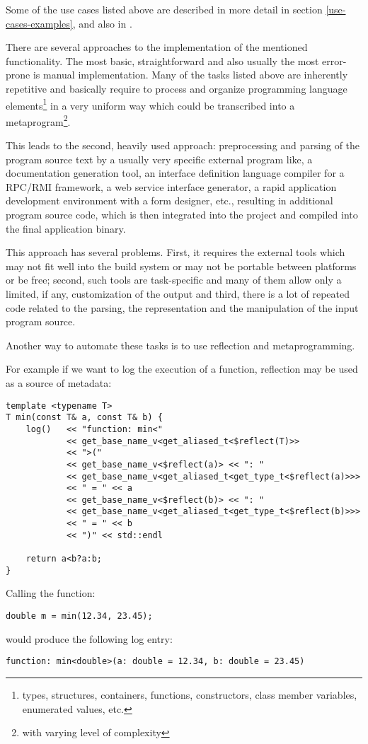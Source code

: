 Some of the use cases listed above are described in more detail in section
\ref{use-cases-examples}, and also in \cite{Chochlik-P0385R1,Chochlik-N4452}.

There are several approaches to the implementation of the mentioned functionality.
The most basic, straightforward and also usually the most
error-prone is manual implementation. Many of the tasks listed above
are inherently repetitive and basically require to process and organize
programming language elements\footnote{types, structures, containers, functions,
constructors, class member variables, enumerated values, etc.}
in a very uniform way which could be transcribed into a metaprogram\footnote{with
varying level of complexity}.

This leads to the second, heavily used approach: preprocessing
and parsing of the program source text by a usually very specific external
program like, a documentation generation tool, an interface definition language
compiler for a RPC/RMI framework, a web service interface generator,
a rapid application development environment with a form designer, etc.,
resulting in additional program source code, which is then integrated into
the project and compiled into the final application binary.

This approach has several problems. First, it requires the external
tools which may not fit well into the build system or may not be portable
between platforms or be free; second, such tools are task-specific
and many of them allow only a limited, if any, customization of the output
and third, there is a lot of repeated code related to the parsing, the
representation and the manipulation of the input program source.

Another way to automate these tasks is to use reflection and metaprogramming.

For example if we want to log the execution of a function, reflection may
be used as a source of metadata:

\begin{verbatim}
template <typename T>
T min(const T& a, const T& b) {
	log()   << "function: min<"
	        << get_base_name_v<get_aliased_t<$reflect(T)>>
	        << ">("
	        << get_base_name_v<$reflect(a)> << ": "
	        << get_base_name_v<get_aliased_t<get_type_t<$reflect(a)>>>
	        << " = " << a
	        << get_base_name_v<$reflect(b)> << ": "
	        << get_base_name_v<get_aliased_t<get_type_t<$reflect(b)>>>
	        << " = " << b
	        << ")" << std::endl

	return a<b?a:b;
}
\end{verbatim}

Calling the \verb@min@ function:

\begin{verbatim}
double m = min(12.34, 23.45);
\end{verbatim}

would produce the following log entry:

\begin{verbatim}
function: min<double>(a: double = 12.34, b: double = 23.45)
\end{verbatim}

